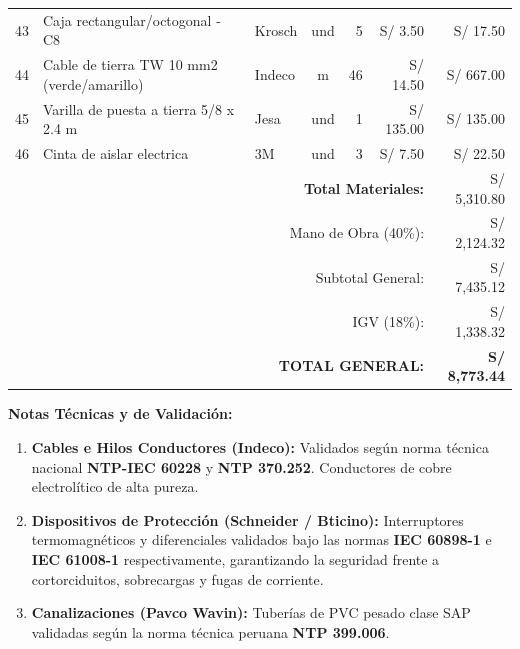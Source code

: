 \documentclass[11pt,a4paper]{article}
\begin{document}
\begin{table}[H]
\begin{small}
\begin{tabularx}{\textwidth}{l X l c r r r}
43 & Caja rectangular/octogonal - C8 & Krosch & und & 5 & S/ 3.50 & S/ 17.50 \\
44 & Cable de tierra TW 10 mm2 (verde/amarillo) & Indeco & m & 46 & S/ 14.50 & S/ 667.00 \\
45 & Varilla de puesta a tierra 5/8 x 2.4 m & Jesa & und & 1 & S/ 135.00 & S/ 135.00 \\
46 & Cinta de aislar electrica & 3M & und & 3 & S/ 7.50 & S/ 22.50 \\
\midrule
\multicolumn{6}{r}{\textbf{Total Materiales:}} & S/ 5,310.80 \\
\multicolumn{6}{r}{Mano de Obra (40\%):} & S/ 2,124.32 \\
\multicolumn{6}{r}{Subtotal General:} & S/ 7,435.12 \\
\multicolumn{6}{r}{IGV (18\%):} & S/ 1,338.32 \\
\multicolumn{6}{r}{\textbf{TOTAL GENERAL:}} & \textbf{S/ 8,773.44} \\
\bottomrule
\end{tabularx}
\end{small}
\end{table}

\vspace{0.6cm}
\textbf{Notas Técnicas y de Validación:}
\begin{enumerate}
    \item \textbf{Cables e Hilos Conductores (Indeco):} Validados según norma técnica nacional \textbf{NTP-IEC 60228} y \textbf{NTP 370.252}. Conductores de cobre electrolítico de alta pureza.
    \item \textbf{Dispositivos de Protección (Schneider / Bticino):} Interruptores termomagnéticos y diferenciales validados bajo las normas \textbf{IEC 60898-1} e \textbf{IEC 61008-1} respectivamente, garantizando la seguridad frente a cortorciduitos, sobrecargas y fugas de corriente.
    \item \textbf{Canalizaciones (Pavco Wavin):} Tuberías de PVC pesado clase SAP validadas según la norma técnica peruana \textbf{NTP 399.006}.
\end{enumerate}
\end{document}
